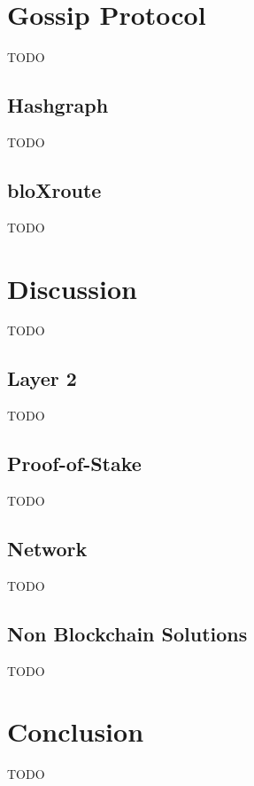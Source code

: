 \documentclass{article}
\begin{document}
\section{Gossip Protocol}
TODO

\subsection{Hashgraph}
TODO

\subsection{bloXroute}
TODO


\section{Discussion}
TODO

\subsection{Layer 2}
TODO

\subsection{Proof-of-Stake}
TODO

\subsection{Network}
TODO

\subsection{Non Blockchain Solutions}
TODO

\section{Conclusion}
TODO



\end{document}
